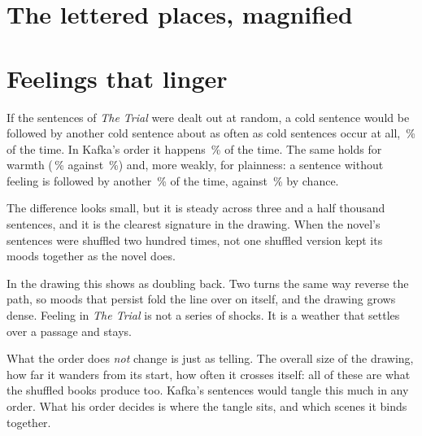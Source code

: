 \clearpage
\thispagestyle{empty}
\noindent\hspace*{0mm}

\clearpage
\section*{The lettered places, magnified}
\noindent

\clearpage
\section{Feelings that linger}

If the sentences of \emph{The Trial} were dealt out at random, a cold sentence
would be followed by another cold sentence about as often as cold sentences
occur at all, \,\% of the time. In Kafka's order it happens
\,\% of the time. The same holds for warmth (\,\% against
\,\%) and, more weakly, for plainness: a sentence without feeling
is followed by another \,\% of the time, against
\,\% by chance.

The difference looks small, but it is steady across three and a half thousand
sentences, and it is the clearest signature in the drawing. When the novel's
sentences were shuffled two hundred times, not one shuffled version kept its
moods together as the novel does.

\begin{figure}[h]
\centering
{}\hfill{}\hfill{}
\end{figure}

In the drawing this shows as doubling back. Two turns the same way reverse the
path, so moods that persist fold the line over on itself, and the drawing grows
dense. Feeling in \emph{The Trial} is not a series of shocks. It is a weather
that settles over a passage and stays.

What the order does \emph{not} change is just as telling. The overall size of
the drawing, how far it wanders from its start, how often it crosses itself:
all of these are what the shuffled books produce too. Kafka's sentences would
tangle this much in any order. What his order decides is where the tangle sits,
and which scenes it binds together.

